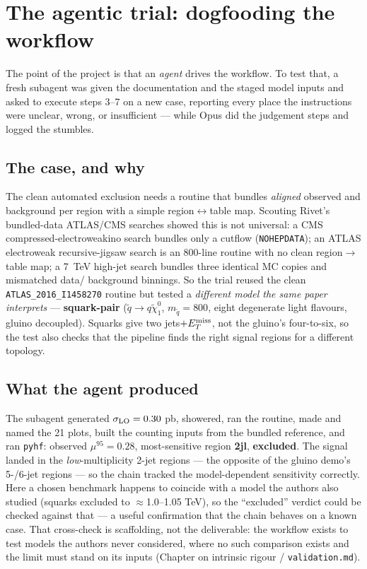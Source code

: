 \documentclass[11pt,oneside]{report}
\newcommand{\code}[1]{\texttt{#1}}
\begin{document}
\chapter{The agentic trial: dogfooding the workflow}
The point of the project is that an \emph{agent} drives the workflow. To test that, a fresh subagent
was given the documentation and the staged model inputs and asked to execute steps 3--7 on a new case,
reporting every place the instructions were unclear, wrong, or insufficient --- while Opus did the
judgement steps and logged the stumbles.

\section{The case, and why}
The clean automated exclusion needs a routine that bundles \emph{aligned} observed and background per
region with a simple region$\leftrightarrow$table map. Scouting Rivet's bundled-data ATLAS/CMS searches
showed this is not universal: a CMS compressed-electroweakino search bundles only a cutflow
(\code{NOHEPDATA}); an ATLAS electroweak recursive-jigsaw search is an 800-line routine with no clean
region$\to$table map; a 7~TeV high-jet search bundles three identical MC copies and mismatched data/
background binnings. So the trial reused the clean \code{ATLAS\_2016\_I1458270} routine but tested a
\emph{different model the same paper interprets} --- \textbf{squark-pair} ($\tilde q\to q\tilde\chi^0_1$,
$m_{\tilde q}=800$, eight degenerate light flavours, gluino decoupled). Squarks give two jets$+E_T^{\rm
miss}$, not the gluino's four-to-six, so the test also checks that the pipeline finds the right
signal regions for a different topology.

\section{What the agent produced}
The subagent generated $\sigma_{\rm LO}=0.30$ pb, showered, ran the routine, made and named the 21
plots, built the counting inputs from the bundled reference, and ran \texttt{pyhf}: observed
$\mu^{95}=0.28$, most-sensitive region \textbf{2jl}, \textbf{excluded}. The signal landed in the
\emph{low}-multiplicity 2-jet regions --- the opposite of the gluino demo's 5-/6-jet regions --- so the
chain tracked the model-dependent sensitivity correctly. Here a chosen benchmark happens to coincide
with a model the authors also studied (squarks excluded to $\approx$1.0--1.05 TeV), so the
``excluded'' verdict could be checked against that --- a useful confirmation that the chain behaves on
a known case. That cross-check is scaffolding, not the deliverable: the workflow exists to test models
the authors never considered, where no such comparison exists and the limit must stand on its inputs
(Chapter on intrinsic rigour / \code{validation.md}).
\end{document}
